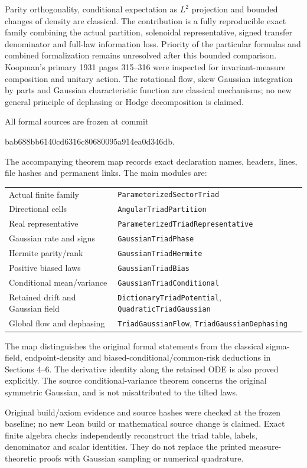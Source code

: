 \documentclass[11pt]{article}
\newcommand{\code}[1]{{\small\nolinkurl{#1}}}
\begin{document}
Parity orthogonality, conditional expectation as $L^2$ projection and
bounded changes of density are classical. The contribution is a
fully reproducible exact family combining the actual partition,
solenoidal representative, signed transfer denominator and full-law
information loss. Priority of the particular formulas and combined
formalization remains unresolved after this bounded comparison. Koopman's primary 1931 pages 315--316 were inspected for invariant-measure composition and unitary action. The rotational flow, skew Gaussian integration by parts and Gaussian characteristic function are classical mechanisms; no new general principle of dephasing or Hodge decomposition is claimed.

All formal sources are frozen at commit
\begin{center}\small\ttfamily
bab688bb6140cd6316c80680095a914ea0d346db.
\end{center}
The accompanying theorem map records exact declaration names,
headers, lines, file hashes and permanent links. The main modules are:
\begin{longtable}{@{}p{}p{}@{}}
Actual finite family&\code{ParameterizedSectorTriad}\\[3pt]
Directional cells&\code{AngularTriadPartition}\\[3pt]
Real representative&\code{ParameterizedTriadRepresentative}\\[3pt]
Gaussian rate and signs&\code{GaussianTriadPhase}\\[3pt]
Hermite parity/rank&\code{GaussianTriadHermite}\\[3pt]
Positive biased laws&\code{GaussianTriadBias}\\[3pt]
Conditional mean/variance&\code{GaussianTriadConditional}\\[3pt]
Retained drift and Gaussian field&\code{DictionaryTriadPotential}, \code{QuadraticTriadGaussian}\\[3pt]
Global flow and dephasing&\code{TriadGaussianFlow}, \code{TriadGaussianDephasing}\\
\end{longtable}
The map distinguishes the original formal statements from the
classical sigma-field, endpoint-density and biased-conditional/common-risk
deductions in Sections 4--6. The derivative identity along the retained
ODE is also proved explicitly. The source conditional-variance theorem
concerns the original symmetric Gaussian, and is not misattributed to
the tilted laws.

Original build/axiom evidence and source hashes were checked at the
frozen baseline; no new Lean build or mathematical source change
is claimed. Exact finite algebra checks independently reconstruct
the triad table, labels, denominator and scalar identities. They do
not replace the printed measure-theoretic proofs with Gaussian
sampling or numerical quadrature.
\end{document}
